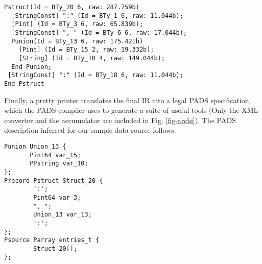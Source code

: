 \documentclass[preprint]{sig-alternate-sigmod08}
\begin{document}
{\small
\begin{verbatim}
Pstruct(Id = BTy_20 6, raw: 287.759b)
  [StringConst] ":" (Id = BTy_1 6, raw: 11.044b);
  [Pint] (Id = BTy_3 6, raw: 65.839b);
  [StringConst] ", " (Id = BTy_6 6, raw: 17.044b);
  Punion(Id = BTy_13 6, raw: 175.421b)
    [Pint] (Id = BTy_15 2, raw: 19.332b);
    [String] (Id = BTy_10 4, raw: 149.044b);
  End Punion;
 [StringConst] ":" (Id = BTy_18 6, raw: 11.044b);
End Pstruct
\end{verbatim}
}

Finally, a pretty printer translates the final IR into a legal PADS 
specification,  which the PADS compiler uses to generate
a suite of useful tools (Only the XML converter and the accumulator are included
in Fig. \ref{fig-archi}).  The PADS description inferred for our
sample data source follows:

{\small
\begin{verbatim}
Punion Union_13 {
       Pint64 var_15;
       PPstring var_10;
};
Precord Pstruct Struct_20 {
        ':';
        Pint64 var_3;
        ", ";
        Union_13 var_13;
        ':';
};
Psource Parray entries_t {
        Struct_20[];
};
\end{verbatim}
}






\end{document}
